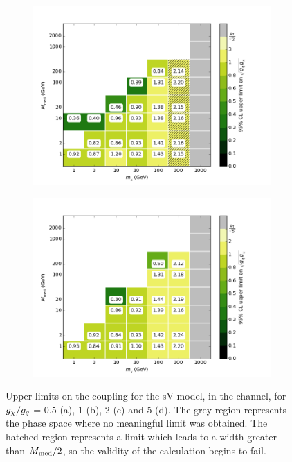 \begin{figure}[h]
\begin{subfigure}[t]{0.495\textwidth}
      \caption{}
    \end{subfigure}
    \begin{subfigure}[t]{0.495\textwidth}
      \centering
      \includegraphics[width=1.\textwidth]{figures/grid_allpoints_SVD_rat2.png}
      \caption{}
    \end{subfigure}
    \begin{subfigure}[t]{0.495\textwidth}
      \centering
      \includegraphics[width=1.\textwidth]{figures/grid_allpoints_SVD_rat5.png}
      \caption{}
    \end{subfigure}
    \caption{Upper limits on the coupling for the sV model, in the \monoZ channel, for $g_{\chi} / g_q$ = 0.5 (a), 1 (b), 2 (c) and 5 (d). The grey region represents the phase space where no meaningful limit was obtained. The hatched region represents a limit which leads to a width greater than $M_{\mathrm{med}} / 2$, so the validity of the calculation begins to fail.}
    \label{fig:MonoZ_SVD_couplinglimit}
\end{figure}


